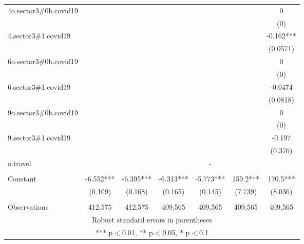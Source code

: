 \documentclass[]{article}
\begin{document}
\begin{tabular}{lcccccc}
4o.sector3\#0b.covid19 &  &  &  &  &  & 0 \\
 &  &  &  &  &  & (0) \\
4.sector3\#1.covid19 &  &  &  &  &  & -0.162*** \\
 &  &  &  &  &  & (0.0571) \\
6o.sector3\#0b.covid19 &  &  &  &  &  & 0 \\
 &  &  &  &  &  & (0) \\
6.sector3\#1.covid19 &  &  &  &  &  & -0.0474 \\
 &  &  &  &  &  & (0.0818) \\
9o.sector3\#0b.covid19 &  &  &  &  &  & 0 \\
 &  &  &  &  &  & (0) \\
9.sector3\#1.covid19 &  &  &  &  &  & -0.197 \\
 &  &  &  &  &  & (0.376) \\
o.travel &  &  &  & - &  &  \\
 &  &  &  &  &  &  \\
Constant & -6.552*** & -6.395*** & -6.313*** & -5.773*** & 159.2*** & 170.5*** \\
 & (0.109) & (0.168) & (0.165) & (0.145) & (7.739) & (8.036) \\
 &  &  &  &  &  &  \\
 Observations & 412,575 & 412,575 & 409,565 & 409,565 & 409,565 & 409,565 \\ \hline
\multicolumn{7}{c}{ Robust standard errors in parentheses} \\
\multicolumn{7}{c}{ *** p$<$0.01, ** p$<$0.05, * p$<$0.1} \\
\end{tabular}
\end{document}
